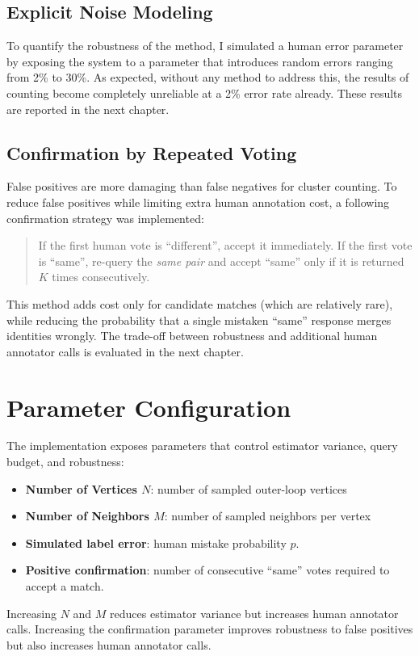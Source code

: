 \subsection{Explicit Noise Modeling}
\label{sec:error_sweeps}

To quantify the robustness of the method, I simulated a human error parameter by exposing the system to a parameter that introduces random errors ranging from 2\% to 30\%. As expected, without any method to address this, the results of counting become completely unreliable at a 2\% error rate already. These results are reported in the next chapter. 

\subsection{Confirmation by Repeated Voting}
\label{sec:confirmation_votes}

False positives are more damaging than false negatives for cluster counting. To reduce false positives while limiting extra human annotation cost, a following confirmation strategy was implemented:

\begin{quote}
    If the first human vote is ``different'', accept it immediately. If the first vote is ``same'', re-query the \emph{same pair} and accept ``same'' only if it is returned \(K\) times consecutively.
\end{quote}

This method adds cost only for candidate matches (which are relatively rare), while reducing the probability that a single mistaken ``same'' response merges identities wrongly. The trade-off between robustness and additional human annotator calls is evaluated in the next chapter. 

\section{Parameter Configuration}
\label{sec:counting_parameters}

The implementation exposes parameters that control estimator variance, query budget, and robustness:

\begin{itemize}
    \item \textbf{Number of Vertices \(N\)}: number of sampled outer-loop vertices
    \item \textbf{Number of Neighbors \(M\)}: number of sampled neighbors per vertex

    \item \textbf{Simulated label error}: human mistake probability \(p\).
    \item \textbf{Positive confirmation}: number of consecutive ``same''
     votes required to accept a match.
\end{itemize}

Increasing \(N\) and \(M\) reduces estimator variance but increases human annotator calls. Increasing the 
confirmation parameter improves robustness to false positives but also increases human annotator calls.

\
